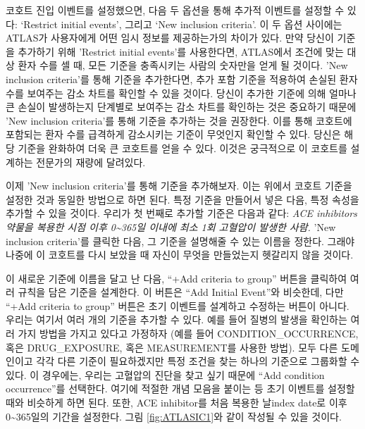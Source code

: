 \documentclass[10.5pt]{book}
\theoremstyle{definition}
\theoremstyle{definition}
\theoremstyle{definition}
\theoremstyle{remark}
\begin{document}
코호트 진입 이벤트를 설정했으면, 다음 두 옵션을 통해 추가적 이벤트를
설정할 수 있다: `Restrict initial events', 그리고 `New inclusion
criteria'. 이 두 옵션 사이에는 ATLAS가 사용자에게 어떤 임시 정보를
제공하는가의 차이가 있다. 만약 당신이 기준을 추가하기 위해 'Restrict
initial events'를 사용한다면, ATLAS에서 조건에 맞는 대상 환자 수를 셀
때, 모든 기준을 충족시키는 사람의 숫자만을 얻게 될 것이다. 'New
inclusion criteria'를 통해 기준을 추가한다면, 추가 포함 기준을 적용하여
손실된 환자 수를 보여주는 감소 차트를 확인할 수 있을 것이다. 당신이
추가한 기준에 의해 얼마나 큰 손실이 발생하는지 단계별로 보여주는 감소
차트를 확인하는 것은 중요하기 때문에 'New inclusion criteria'를 통해
기준을 추가하는 것을 권장한다. 이를 통해 코호트에 포함되는 환자 수를
급격하게 감소시키는 기준이 무엇인지 확인할 수 있다. 당신은 해당 기준을
완화하여 더욱 큰 코호트를 얻을 수 있다. 이것은 궁극적으로 이 코호트를
설계하는 전문가의 재량에 달려있다.

이제 'New inclusion criteria'를 통해 기준을 추가해보자. 이는 위에서
코호트 기준을 설정한 것과 동일한 방법으로 하면 된다. 특정 기준을
만들어서 넣은 다음, 특정 속성을 추가할 수 있을 것이다. 우리가 첫 번째로
추가할 기준은 다음과 같다: \emph{ACE inhibitors 약물을 복용한 시점 이후
0\textasciitilde{}365일 이내에 최소 1회 고혈압이 발생한 사람.} 'New
inclusion criteria'를 클릭한 다음, 그 기준을 설명해줄 수 있는 이름을
정한다. 그래야 나중에 이 코호트를 다시 보았을 때 자신이 무엇을
만들었는지 헷갈리지 않을 것이다.

이 새로운 기준에 이름을 달고 난 다음, ``+Add criteria to group'' 버튼을
클릭하여 여러 규칙을 담은 기준을 설계한다. 이 버튼은 ``Add Initial
Event''와 비슷한데, 다만 ``+Add criteria to group'' 버튼은 초기 이벤트를
설계하고 수정하는 버튼이 아니다. 우리는 여기서 여러 개의 기준을 추가할
수 있다. 예를 들어 질병의 발생을 확인하는 여러 가지 방법을 가지고 있다고
가정하자 (예를 들어 CONDITION\_OCCURRENCE, 혹은 DRUG\_EXPOSURE, 혹은
MEASUREMENT를 사용한 방법). 모두 다른 도메인이고 각각 다른 기준이
필요하겠지만 특정 조건을 찾는 하나의 기준으로 그룹화할 수 있다. 이
경우에는, 우리는 고혈압의 진단을 찾고 싶기 때문에 ``Add condition
occurrence''를 선택한다. 여기에 적절한 개념 모음을 붙이는 등 초기
이벤트를 설정할 때와 비슷하게 하면 된다. 또한, ACE inhibitor를 처음
복용한 날index date로 이후 0\textasciitilde{}365일의 기간을 설정한다.
그림 \ref{fig:ATLASIC1}와 같이 작성될 수 있을 것이다.
\end{document}

